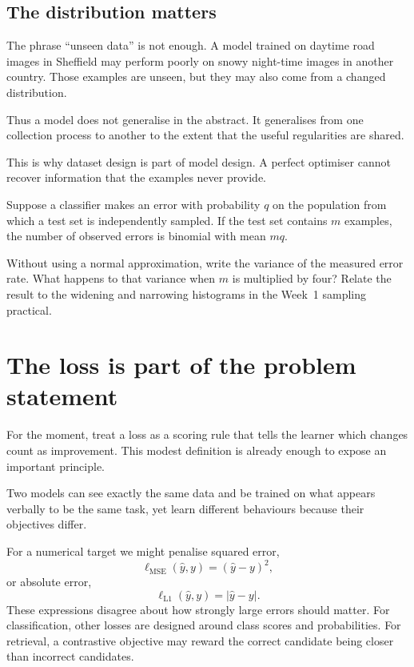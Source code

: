 \subsection{The distribution matters}

The phrase ``unseen data'' is not enough. A model trained on daytime road images in Sheffield may perform poorly on snowy night-time images in another country. Those examples are unseen, but they may also come from a changed distribution.

Thus a model does not generalise in the abstract. It generalises from one collection process to another to the extent that the useful regularities are shared.

This is why dataset design is part of model design. A perfect optimiser cannot recover information that the examples never provide.

\begin{optionalexercise}[title={Optional mathematics --- empirical and expected error}]
Suppose a classifier makes an error with probability \(q\) on the population from which a test set is independently sampled. If the test set contains \(m\) examples, the number of observed errors is binomial with mean \(mq\).

Without using a normal approximation, write the variance of the measured error rate. What happens to that variance when \(m\) is multiplied by four? Relate the result to the widening and narrowing histograms in the Week~1 sampling practical.
\end{optionalexercise}

\section{The loss is part of the problem statement}

For the moment, treat a loss as a scoring rule that tells the learner which changes count as improvement. This modest definition is already enough to expose an important principle.

Two models can see exactly the same data and be trained on what appears verbally to be the same task, yet learn different behaviours because their objectives differ.

For a numerical target we might penalise squared error,
\[
  \ell_{\mathrm{MSE}}(\hat y,y)=(\hat y-y)^2,
\]
or absolute error,
\[
  \ell_{\mathrm{L1}}(\hat y,y)=|\hat y-y|.
\]
These expressions disagree about how strongly large errors should matter. For classification, other losses are designed around class scores and probabilities. For retrieval, a contrastive objective may reward the correct candidate being closer than incorrect candidates.


